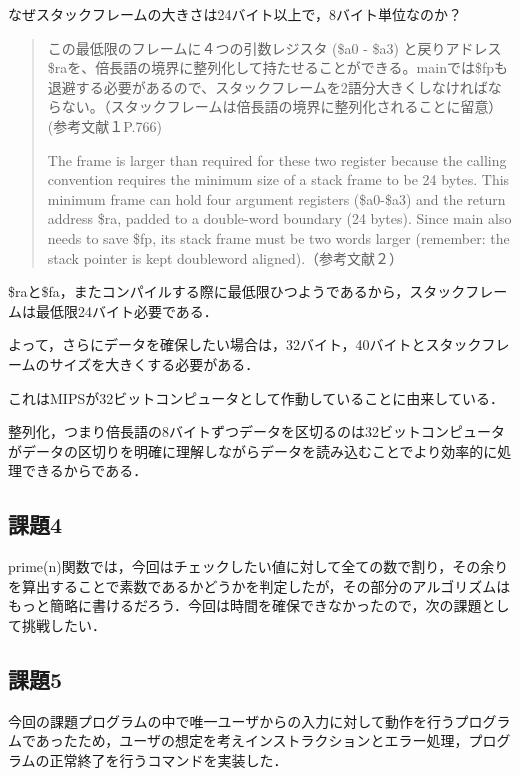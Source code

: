 \documentclass[a4j]{jarticle}
\begin{document}
なぜスタックフレームの大きさは24バイト以上で，8バイト単位なのか？  

\begin{quote}
この最低限のフレームに４つの引数レジスタ (\$a0 - \$a3) と戻りアドレス\$raを、倍長語の境界に整列化して持たせることができる。mainでは\$fpも退避する必要があるので、スタックフレームを2語分大きくしなければならない。（スタックフレームは倍長語の境界に整列化されることに留意）(参考文献１P.766)

The frame is larger than required for these two register because the calling convention requires the minimum size of a stack frame to be 24 bytes. This minimum frame can hold four argument registers (\$a0-\$a3) and the return address \$ra, padded to a double-word boundary (24 bytes). Since main also needs to save \$fp, its stack frame must be two words larger (remember: the stack pointer is kept doubleword aligned).（参考文献２）
\end{quote}

\$raと\$fa，またコンパイルする際に最低限ひつようであるから，スタックフレームは最低限24バイト必要である．

よって，さらにデータを確保したい場合は，32バイト，40バイトとスタックフレームのサイズを大きくする必要がある．

これはMIPSが32ビットコンピュータとして作動していることに由来している．

整列化，つまり倍長語の8バイトずつデータを区切るのは32ビットコンピュータがデータの区切りを明確に理解しながらデータを読み込むことでより効率的に処理できるからである．




\subsection{課題4}

prime(n)関数では，今回はチェックしたい値に対して全ての数で割り，その余りを算出することで素数であるかどうかを判定したが，その部分のアルゴリズムはもっと簡略に書けるだろう．今回は時間を確保できなかったので，次の課題として挑戦したい．


\subsection{課題5}

今回の課題プログラムの中で唯一ユーザからの入力に対して動作を行うプログラムであったため，ユーザの想定を考えインストラクションとエラー処理，プログラムの正常終了を行うコマンドを実装した．
\end{document}
